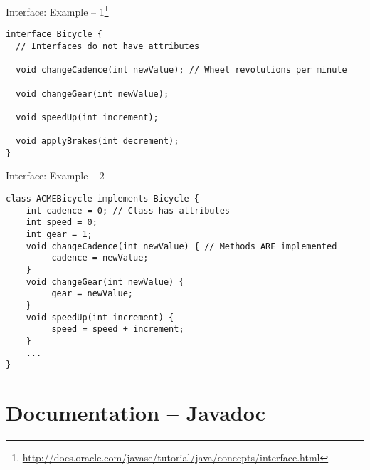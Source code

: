 \documentclass[English,c,%
hyperref={%
    pdftitle={FISA-DE2 OOP in Java},%
    pdfauthor={Muller, Gravier, Laforest, Subercaze},%
    pdfsubject={OOP in Java},%
    pdfkeywords={OOP, Java}%
    },%
xcolor={pdftex,svgnames} %
]{beamer}
\begin{document}
\begin{frame}[fragile]{Interface: Example -- 1\footnote{\url{http://docs.oracle.com/javase/tutorial/java/concepts/interface.html}}}
\vspace{-1em}
\begin{lstlisting}[escapechar=\%,label=intex,caption=Bicycle.java,basicstyle=\footnotesize]
interface Bicycle {
  // Interfaces do not have attributes

  void changeCadence(int newValue); // Wheel revolutions per minute

  void changeGear(int newValue);

  void speedUp(int increment);

  void applyBrakes(int decrement);
}
\end{lstlisting}

\end{frame}


\begin{frame}[fragile]{Interface: Example -- 2}
\vspace{-1.2em}
\begin{lstlisting}[escapechar=\%,label=intex,caption=ACMEBicycle.java,basicstyle=\footnotesize]
class ACMEBicycle implements Bicycle {
    int cadence = 0; // Class has attributes
    int speed = 0;
    int gear = 1;
    void changeCadence(int newValue) { // Methods ARE implemented
         cadence = newValue;
    }
    void changeGear(int newValue) {
         gear = newValue;
    }
    void speedUp(int increment) {
         speed = speed + increment;
    }
    ...
}
\end{lstlisting}
\end{frame}


\section{Documentation -- Javadoc}
\end{document}
